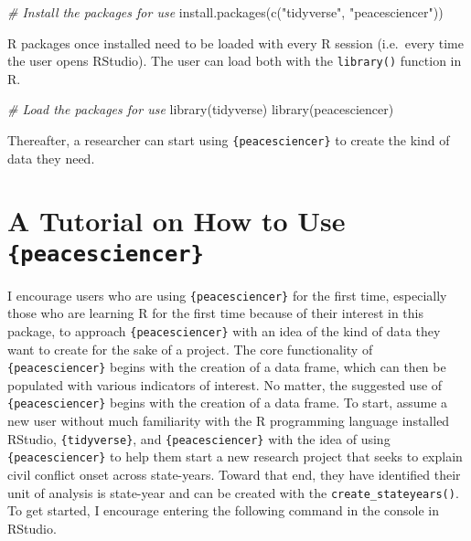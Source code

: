 \documentclass[
  11pt,
]{article}
\newenvironment{Shaded}{\begin{snugshade}}{\end{snugshade}}
\newcommand{\CommentTok}[1]{\textcolor[rgb]{0.56,0.35,0.01}{\textit{#1}}}
\newcommand{\FunctionTok}[1]{\textcolor[rgb]{0.00,0.00,0.00}{#1}}
\newcommand{\NormalTok}[1]{#1}
\newcommand{\StringTok}[1]{\textcolor[rgb]{0.31,0.60,0.02}{#1}}
\begin{document}
\begin{Shaded}
\begin{Highlighting}[]
\CommentTok{\# Install the packages for use}
\FunctionTok{install.packages}\NormalTok{(}\FunctionTok{c}\NormalTok{(}\StringTok{"tidyverse"}\NormalTok{, }\StringTok{"peacesciencer"}\NormalTok{))}
\end{Highlighting}
\end{Shaded}

R packages once installed need to be loaded with every R session (i.e.~every time the user opens RStudio). The user can load both with the \texttt{library()} function in R.

\begin{Shaded}
\begin{Highlighting}[]
\CommentTok{\# Load the packages for use}
\FunctionTok{library}\NormalTok{(tidyverse)}
\FunctionTok{library}\NormalTok{(peacesciencer)}
\end{Highlighting}
\end{Shaded}

Thereafter, a researcher can start using \texttt{\{peacesciencer\}} to create the kind of data they need.

\hypertarget{a-tutorial-on-how-to-use-peacesciencer}{%
\section{\texorpdfstring{A Tutorial on How to Use \texttt{\{peacesciencer\}}}{A Tutorial on How to Use \{peacesciencer\}}}\label{a-tutorial-on-how-to-use-peacesciencer}}

I encourage users who are using \texttt{\{peacesciencer\}} for the first time, especially those who are learning R for the first time because of their interest in this package, to approach \texttt{\{peacesciencer\}} with an idea of the kind of data they want to create for the sake of a project. The core functionality of \texttt{\{peacesciencer\}} begins with the creation of a data frame, which can then be populated with various indicators of interest. No matter, the suggested use of \texttt{\{peacesciencer\}} begins with the creation of a data frame. To start, assume a new user without much familiarity with the R programming language installed RStudio, \texttt{\{tidyverse\}}, and \texttt{\{peacesciencer\}} with the idea of using \texttt{\{peacesciencer\}} to help them start a new research project that seeks to explain civil conflict onset across state-years. Toward that end, they have identified their unit of analysis is state-year and can be created with the \texttt{create\_stateyears()}. To get started, I encourage entering the following command in the console in RStudio.
\end{document}
